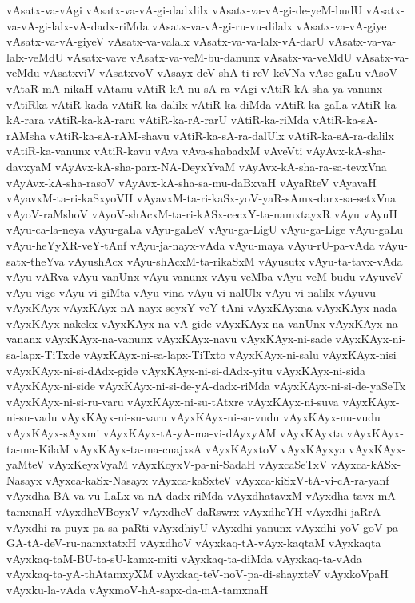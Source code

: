 {vAsatx-va-vAgi
vAsatx-va-vA-gi-dadxlilx
vAsatx-va-vA-gi-de-yeM-budU
vAsatx-va-vA-gi-lalx-vA-dadx-riMda
vAsatx-va-vA-gi-ru-vu-dilalx
vAsatx-va-vA-giye
vAsatx-va-vA-giyeV
vAsatx-va-valalx
vAsatx-va-va-lalx-vA-darU
vAsatx-va-va-lalx-veMdU
vAsatx-vave
vAsatx-va-veM-bu-danunx
vAsatx-va-veMdU
vAsatx-va-veMdu
vAsatxviV
vAsatxvoV
vAsayx-deV-shA-ti-reV-keVNa
vAse-gaLu
vAsoV
vAtaR-mA-nikaH
vAtanu
vAtiR-kA-nu-sA-ra-vAgi
vAtiR-kA-sha-ya-vanunx
vAtiRka
vAtiR-kada
vAtiR-ka-dalilx
vAtiR-ka-diMda
vAtiR-ka-gaLa
vAtiR-ka-kA-rara
vAtiR-ka-kA-raru
vAtiR-ka-rA-rarU
vAtiR-ka-riMda
vAtiR-ka-sA-rAMsha
vAtiR-ka-sA-rAM-shavu
vAtiR-ka-sA-ra-dalUlx
vAtiR-ka-sA-ra-dalilx
vAtiR-ka-vanunx
vAtiR-kavu
vAva
vAva-shabadxM
vAveVti
vAyAvx-kA-sha-davxyaM
vAyAvx-kA-sha-parx-NA-DeyxYvaM
vAyAvx-kA-sha-ra-sa-tevxVna
vAyAvx-kA-sha-rasoV
vAyAvx-kA-sha-sa-mu-daBxvaH
vAyaRteV
vAyavaH
vAyavxM-ta-ri-kaSxyoVH
vAyavxM-ta-ri-kaSx-yoV-yaR-sAmx-darx-sa-setxVna
vAyoV-raMshoV
vAyoV-shAcxM-ta-ri-kASx-cecxY-ta-namxtayxR
vAyu
vAyuH
vAyu-ca-la-neya
vAyu-gaLa
vAyu-gaLeV
vAyu-ga-LigU
vAyu-ga-Lige
vAyu-gaLu
vAyu-heYyXR-veY-tAnf
vAyu-ja-nayx-vAda
vAyu-maya
vAyu-rU-pa-vAda
vAyu-satx-theYva
vAyushAcx
vAyu-shAcxM-ta-rikaSxM
vAyusutx
vAyu-ta-tavx-vAda
vAyu-vARva
vAyu-vanUnx
vAyu-vanunx
vAyu-veMba
vAyu-veM-budu
vAyuveV
vAyu-vige
vAyu-vi-giMta
vAyu-vina
vAyu-vi-nalUlx
vAyu-vi-nalilx
vAyuvu
vAyxKAyx
vAyxKAyx-nA-nayx-seyxY-veY-tAni
vAyxKAyxna
vAyxKAyx-nada
vAyxKAyx-nakekx
vAyxKAyx-na-vA-gide
vAyxKAyx-na-vanUnx
vAyxKAyx-na-vananx
vAyxKAyx-na-vanunx
vAyxKAyx-navu
vAyxKAyx-ni-sade
vAyxKAyx-ni-sa-lapx-TiTxde
vAyxKAyx-ni-sa-lapx-TiTxto
vAyxKAyx-ni-salu
vAyxKAyx-nisi
vAyxKAyx-ni-si-dAdx-gide
vAyxKAyx-ni-si-dAdx-yitu
vAyxKAyx-ni-sida
vAyxKAyx-ni-side
vAyxKAyx-ni-si-de-yA-dadx-riMda
vAyxKAyx-ni-si-de-yaSeTx
vAyxKAyx-ni-si-ru-varu
vAyxKAyx-ni-su-tAtxre
vAyxKAyx-ni-suva
vAyxKAyx-ni-su-vadu
vAyxKAyx-ni-su-varu
vAyxKAyx-ni-su-vudu
vAyxKAyx-nu-vudu
vAyxKAyx-sAyxmi
vAyxKAyx-tA-yA-ma-vi-dAyxyAM
vAyxKAyxta
vAyxKAyx-ta-ma-KilaM
vAyxKAyx-ta-ma-cnajxsA
vAyxKAyxtoV
vAyxKAyxya
vAyxKAyx-yaMteV
vAyxKeyxVyaM
vAyxKoyxV-pa-ni-SadaH
vAyxcaSeTxV
vAyxca-kASx-Nasayx
vAyxca-kaSx-Nasayx
vAyxca-kaSxteV
vAyxca-kiSxV-tA-vi-cA-ra-yanf
vAyxdha-BA-va-vu-LaLx-va-nA-dadx-riMda
vAyxdhatavxM
vAyxdha-tavx-mA-tamxnaH
vAyxdheVBoyxV
vAyxdheV-daRswrx
vAyxdheYH
vAyxdhi-jaRrA
vAyxdhi-ra-puyx-pa-sa-paRti
vAyxdhiyU
vAyxdhi-yanunx
vAyxdhi-yoV-goV-pa-GA-tA-deV-ru-namxtatxH
vAyxdhoV
vAyxkaq-tA-vAyx-kaqtaM
vAyxkaqta
vAyxkaq-taM-BU-ta-sU-kamx-miti
vAyxkaq-ta-diMda
vAyxkaq-ta-vAda
vAyxkaq-ta-yA-thAtamxyXM
vAyxkaq-teV-noV-pa-di-shayxteV
vAyxkoVpaH
vAyxku-la-vAda
vAyxmoV-hA-sapx-da-mA-tamxnaH
}
